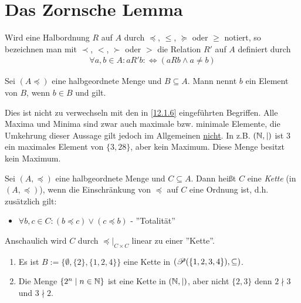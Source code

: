 \documentclass[../../main.tex]{subfiles}
\begin{document}
\section{Das Zornsche Lemma}

\begin{nt}\label{12.2.1} 
	Wird eine Halbordnung $R$ auf $A$ durch $\preceq$, $\le$, $\succeq$ oder $\ge$ notiert, so bezeichnen man mit $\prec$, $<$, $\succ$ oder $>$ die Relation $R'$ auf $A$ definiert durch
	\begin{align*}
		\forall a,b\in A: aR'b:\Longleftrightarrow (aRb\land a\neq b)
	\end{align*}
\end{nt}	

\begin{df}\label{12.2.2} 
	Sei $(A\preceq)$ eine halbgeordnete Menge und $B\subseteq A$. Mann nennt $b$ ein   Element von $B$, wenn $b\in B$ und  gilt.
\end{df}

\begin{bem}\label{12.2.3} 
	Dies ist nicht zu verwechseln mit den in \ref{12.1.6} eingeführten Begriffen. Alle Maxima und Minima sind zwar auch maximale bzw. minimale Elemente, die Umkehrung dieser Aussage gilt jedoch im Allgemeinen \underline{nicht}. In z.B. $(\mathbb N,\mid)$ ist $3$ ein maximales Element von $\{3,28\}$, aber kein Maximum. Diese Menge besitzt kein Maximum.
\end{bem}
		
\begin{df}\label{12.2.4}
	Sei $(A,\preceq)$ eine halbgeordnete Menge und $C\subseteq A$. Dann heißt $C$ eine \emph{Kette} (in $(A,\preceq)$), wenn die Einschränkung von $\preceq$ auf $C$ eine Ordnung ist, d.h. zusätzlich gilt:
	\begin{itemize}
		\item $\forall b,c\in C: (b\preceq c)\lor(c\preceq b)$ - ''Totalität''
	\end{itemize}
	Anschaulich wird $C$ durch $\preceq\vert_{C\times C}$ linear zu einer ''Kette''.
\end{df}
		
\begin{bsp}\label{12.2.5}
	\begin{enumerate}[\normalfont(a)]
		\item Es ist $B:=\{\emptyset,\{2\},\{1,2,4\}\}$ eine Kette in $(\mathcal P(\{1,2,3,4\}),\subseteq)$.
		\item Die Menge $\{2^n\mid n\in\mathbb N\}$ ist eine Kette in $(\mathbb N,\mid)$, aber nicht $\{2,3\}$ denn $2\nmid 3$ und $3\nmid 2$.
	\end{enumerate}
\end{bsp}
\end{document}

